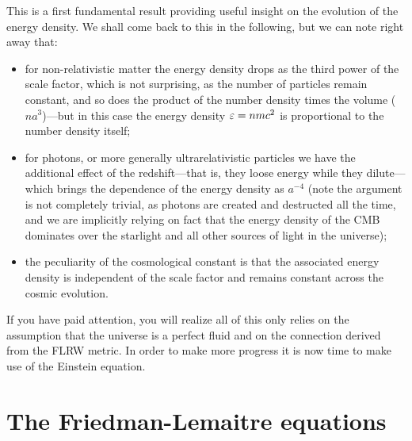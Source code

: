 This is a first fundamental result providing useful insight on the evolution of
the energy density. We shall come back to this in the following, but we can note
right away that:
\begin{itemize}
  \item for non-relativistic matter the energy density drops as the third power of the
  scale factor, which is not surprising, as the number of particles remain constant,
  and so does the product of the number density times the volume ($n a^3$)---but in
  this case the energy density $\varepsilon = n mc^2$ is proportional to the number
  density itself;
  \item for photons, or more generally ultrarelativistic particles we have the additional
  effect of the redshift---that is, they loose energy while they dilute---which brings
  the dependence of the energy density as $a^{-4}$ (note the argument is not completely
  trivial, as photons are created and destructed all the time, and we are implicitly
  relying on fact that the energy density of the CMB dominates over the starlight
  and all other sources of light in the universe);
  \item the peculiarity of the cosmological constant is that the associated energy
  density is independent of the scale factor and remains constant across the cosmic
  evolution.
\end{itemize}

If you have paid attention, you will realize all of this only relies on the assumption
that the universe is a perfect fluid and on the connection derived from the FLRW
metric. In order to make more progress it is now time to make use of the
Einstein equation.



\section{The Friedman-Lemaitre equations}


